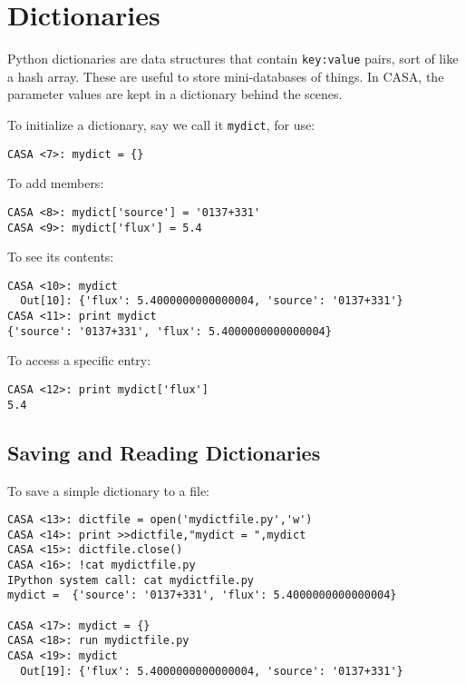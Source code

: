 \section{Dictionaries}
\label{section:python.dict}

Python dictionaries are data structures that contain {\tt key:value}
pairs, sort of like a hash array.  These are useful to store
mini-databases of things.  In CASA, the parameter values are kept
in a dictionary behind the scenes.

To initialize a dictionary, say we call it {\tt mydict}, for use:
\small
\begin{verbatim}
CASA <7>: mydict = {}
\end{verbatim}
\normalsize

To add members:
\small
\begin{verbatim}
CASA <8>: mydict['source'] = '0137+331'
CASA <9>: mydict['flux'] = 5.4
\end{verbatim}
\normalsize

To see its contents:
\small
\begin{verbatim}
CASA <10>: mydict
  Out[10]: {'flux': 5.4000000000000004, 'source': '0137+331'}
CASA <11>: print mydict 
{'source': '0137+331', 'flux': 5.4000000000000004}
\end{verbatim}
\normalsize

To access a specific entry:
\small
\begin{verbatim}
CASA <12>: print mydict['flux']
5.4
\end{verbatim}
\normalsize

\subsection{Saving and Reading Dictionaries}
\label{section:python.dict.save}

To save a simple dictionary to a file:
\small
\begin{verbatim}
CASA <13>: dictfile = open('mydictfile.py','w')
CASA <14>: print >>dictfile,"mydict = ",mydict
CASA <15>: dictfile.close()
CASA <16>: !cat mydictfile.py
IPython system call: cat mydictfile.py
mydict =  {'source': '0137+331', 'flux': 5.4000000000000004}

CASA <17>: mydict = {}
CASA <18>: run mydictfile.py
CASA <19>: mydict
  Out[19]: {'flux': 5.4000000000000004, 'source': '0137+331'}
\end{verbatim}
\normalsize

